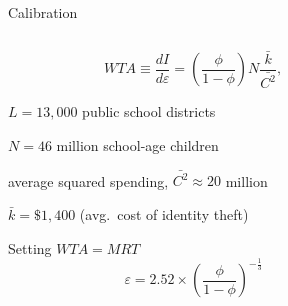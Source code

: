 \begin{frame}{Calibration}
\begin{columns}[T] %
\begin{column}{.58\textwidth}
		\begin{equation*}
			WTA \equiv \frac{dI}{d\varepsilon} = \left(\frac{\phi}{1-\phi}\right) N\frac{\bar{k}}{\bar{C^{2}}},
		\end{equation*}
  \begin{wideitemize}
    \item $L=13,000$ public school districts
    \item $N=46$ million school-age children
    \item average squared spending, $\bar{C^{2}}\approx 20$ million
    \item $\bar{k}=\$1,400$ (avg.\ cost of identity theft)
    \item Setting $WTA = MRT$ 
      $$\varepsilon = 2.52\times \left(\frac{\phi}{1-\phi}\right)^{-\frac{1}{3}}$$
  \end{wideitemize}
\end{column}%
\hfill%
\begin{column}{.38\textwidth}
\end{column}%
\end{columns}
\end{frame}

